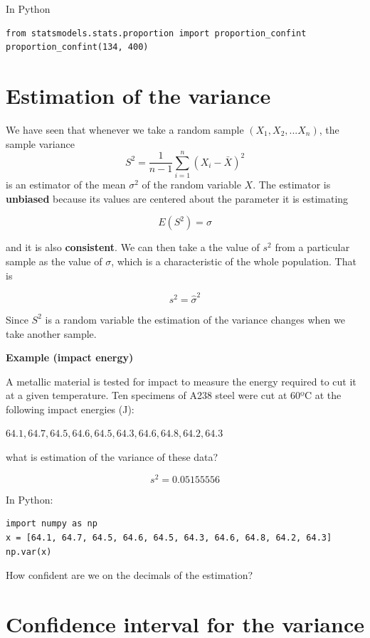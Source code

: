 \documentclass[
]{book}
\begin{document}
In Python

\begin{verbatim}
from statsmodels.stats.proportion import proportion_confint
proportion_confint(134, 400)
\end{verbatim}

\hypertarget{estimation-of-the-variance}{%
\section{Estimation of the variance}\label{estimation-of-the-variance}}

We have seen that whenever we take a random sample \((X_1, X_2, ... X_n)\), the sample variance
\[S^2=\frac{1}{n-1}\sum_{i=1}^n (X_i-\bar{X})^2\]
is an estimator of the mean \(\sigma^2\) of the random variable \(X\). The estimator is \textbf{unbiased} because its values are centered about the parameter it is estimating

\[E(S^2)=\sigma\]

and it is also \textbf{consistent}. We can then take a the value of \(s^2\) from a particular sample as the value of \(\sigma\), which is a characteristic of the whole population. That is

\[s^2=\hat{\sigma}^2\]

Since \(S^2\) is a random variable the estimation of the variance changes when we take another sample.

\textbf{Example (impact energy)}

A metallic material is tested for impact to measure the energy required to cut it at a given temperature. Ten specimens of A238 steel were cut at 60ºC at the following impact energies (J):

\(64.1, 64.7, 64.5, 64.6, 64.5, 64.3, 64.6, 64.8, 64.2, 64.3\)

what is estimation of the variance of these data?

\[s^2=0.05155556\]

In Python:

\begin{verbatim}
import numpy as np
x = [64.1, 64.7, 64.5, 64.6, 64.5, 64.3, 64.6, 64.8, 64.2, 64.3]
np.var(x)
\end{verbatim}

How confident are we on the decimals of the estimation?

\hypertarget{confidence-interval-for-the-variance}{%
\section{Confidence interval for the variance}\label{confidence-interval-for-the-variance}}
\end{document}
